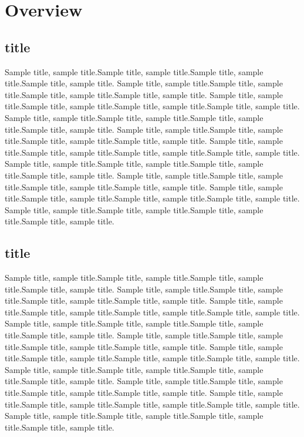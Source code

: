 \documentclass{book}
\begin{document}
	
	\chapter{Overview}
	\section{title}
	Sample title, sample title.Sample title, sample title.Sample title, sample title.Sample title, sample title.
	Sample title, sample title.Sample title, sample title.Sample title, sample title.Sample title, sample title.
	Sample title, sample title.Sample title, sample title.Sample title, sample title.Sample title, sample title.
	Sample title, sample title.Sample title, sample title.Sample title, sample title.Sample title, sample title.
	Sample title, sample title.Sample title, sample title.Sample title, sample title.Sample title, sample title.
	Sample title, sample title.Sample title, sample title.Sample title, sample title.Sample title, sample title.
	Sample title, sample title.Sample title, sample title.Sample title, sample title.Sample title, sample title.
	Sample title, sample title.Sample title, sample title.Sample title, sample title.Sample title, sample title.
	Sample title, sample title.Sample title, sample title.Sample title, sample title.Sample title, sample title.
	Sample title, sample title.Sample title, sample title.Sample title, sample title.Sample title, sample title.
	
	\section{title}
	Sample title, sample title.Sample title, sample title.Sample title, sample title.Sample title, sample title.
	Sample title, sample title.Sample title, sample title.Sample title, sample title.Sample title, sample title.
	Sample title, sample title.Sample title, sample title.Sample title, sample title.Sample title, sample title.
	Sample title, sample title.Sample title, sample title.Sample title, sample title.Sample title, sample title.
	Sample title, sample title.Sample title, sample title.Sample title, sample title.Sample title, sample title.
	Sample title, sample title.Sample title, sample title.Sample title, sample title.Sample title, sample title.
	Sample title, sample title.Sample title, sample title.Sample title, sample title.Sample title, sample title.
	Sample title, sample title.Sample title, sample title.Sample title, sample title.Sample title, sample title.
	Sample title, sample title.Sample title, sample title.Sample title, sample title.Sample title, sample title.
	Sample title, sample title.Sample title, sample title.Sample title, sample title.Sample title, sample title.
	
\end{document}
